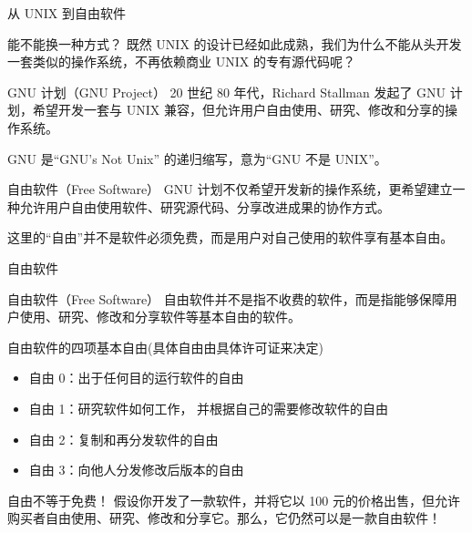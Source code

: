 \documentclass[aspectratio=169]{beamer}
\begin{document}
\begin{frame}{从 UNIX 到自由软件}
	
	\begin{block}{能不能换一种方式？}
		\hspace*{2em}既然 UNIX 的设计已经如此成熟，我们为什么不能从头开发一套类似的操作系统，不再依赖商业 UNIX 的专有源代码呢？	
	\end{block}
	\pause
	\begin{block}{GNU 计划（GNU Project）}
		\hspace*{2em}20 世纪 80 年代，Richard Stallman 发起了 GNU 计划，希望开发一套与 UNIX 兼容，但允许用户自由使用、研究、修改和分享的操作系统。
		
		\par\hspace*{2em}GNU 是``GNU's Not Unix'' 的递归缩写，意为“GNU 不是 UNIX”。
	\end{block}
	\pause
	\begin{block}{自由软件（Free Software）}
		\hspace*{2em}GNU 计划不仅希望开发新的操作系统，更希望建立一种允许用户自由使用软件、研究源代码、分享改进成果的协作方式。
		
		\par\hspace*{2em}\alert{这里的“自由”并不是软件必须免费，而是用户对自己使用的软件享有基本自由。}
	\end{block}
	
\end{frame}


\begin{frame}{自由软件}
	\begin{block}{自由软件（Free Software）}
		\hspace*{2em}自由软件并不是指不收费的软件，而是指能够保障用户使用、研究、修改和分享软件等基本自由的软件。
	\end{block}
	\pause
	\begin{block}{自由软件的四项基本自由(具体自由由具体许可证来决定)}
		\begin{itemize}
			\item 自由 0：出于任何目的运行软件的自由
			\item 自由 1：研究软件如何工作，
			并根据自己的需要修改软件的自由
			\item 自由 2：复制和再分发软件的自由
			\item 自由 3：向他人分发修改后版本的自由
		\end{itemize}
	\end{block}
	\pause
	\begin{block}{自由不等于免费！}
		\hspace*{2em}假设你开发了一款软件，并将它以 100 元的价格出售，但允许购买者自由使用、研究、修改和分享它。\alert{那么，它仍然可以是一款自由软件！}
	\end{block}
\end{frame}
\end{document}
